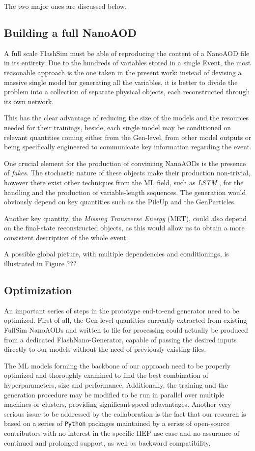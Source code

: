 The two major ones are discussed below.


\subsection{Building a full NanoAOD}
A full scale FlashSim must be able of reproducing the content of a NanoAOD file in its entirety. Due to the hundreds of variables stored in a single Event, the most reasonable approach is the one taken in the present work: instead of devising a massive single model for generating all the variables, it is better to divide the problem into a collection of separate physical objects, each reconstructed through its own network.

This has the clear advantage of reducing the size of the models and the resources needed for their trainings, beside, each single model may be conditioned on relevant quantities coming either from the Gen-level, from other model outputs or being specifically engineered to communicate key information regarding the event.

One crucial element for the production of convincing NanoAODs is the presence of \emph{fakes}. The stochastic nature of these objects make their production non-trivial, however there exist other techniques from the ML field, such as \emph{LSTM} \cite{lstm}, for the handling and the production of variable-length sequences. The generation would obviously depend on key quantities such as the PileUp and the GenParticles.

Another key quantity, the \emph{Missing Transverse Energy} (MET), could also depend on the final-state reconstructed objects, as this would allow us to obtain a more consistent description of the whole event.

A possible global picture, with multiple dependencies and conditionings, is illustrated in Figure ???

\subsection{Optimization}
An important series of steps in the prototype end-to-end generator need to be optimized. 
First of all, the Gen-level quantities currently extracted from existing FullSim NanoAODs and written to file for processing could actually be produced from a dedicated FlashNano-Generator, capable of passing the desired inputs directly to our models without the need of previously existing files.

The ML models forming the backbone of our approach need to be properly optimized and thoroughly examined to find the best combination of hyperparameters, size and performance. Additionally, the training and the generation procedure may be modified to be run in parallel over multiple machines or clusters, providing significant speed adavantages. Another very serious issue to be addressed by the collaboration is the fact that our research is based on a series of \texttt{Python} packages maintained by a series of open-source contributors with no interest in the specific HEP use case and no assurance of continued and prolonged support, as well as backward compatibility.

